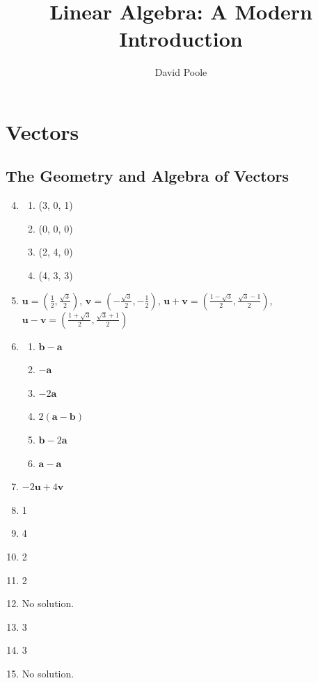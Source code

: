 \documentclass{article}
\title{Linear Algebra: A Modern Introduction}
\author{David Poole}
\date{}
\begin{document}
\maketitle
\section{Vectors}
\subsection{The Geometry and Algebra of Vectors}
\begin{enumerate}
  \setcounter{enumi}{3}
  \item \begin{enumerate}
          \item (3, 0, 1)
          \item (0, 0, 0)
          \item (2, 4, 0)
          \item (4, 3, 3)
        \end{enumerate}
        \setcounter{enumi}{12}
  \item $\mathbf{u}=(\frac{1}{2}, \frac{\sqrt{3}}{2})$,
        $\mathbf{v}=(-\frac{\sqrt{3}}{2}, -\frac{1}{2})$,
        $\mathbf{u}+\mathbf{v}=(\frac{1-\sqrt{3}}{2}, \frac{\sqrt{3}-1}{2})$,
        $\mathbf{u}-\mathbf{v}=(\frac{1+\sqrt{3}}{2}, \frac{\sqrt{3}+1}{2})$
  \item \begin{enumerate}
          \item $\mathbf{b}-\mathbf{a}$
          \item $-\mathbf{a}$
          \item $-2\mathbf{a}$
          \item $2(\mathbf{a}-\mathbf{b})$
          \item $\mathbf{b}-2\mathbf{a}$
          \item $\mathbf{a}-\mathbf{a}$
        \end{enumerate}
        \setcounter{enumi}{20}
  \item $-2\mathbf{u}+4\mathbf{v}$
        \setcounter{enumi}{39}
  \item 1
        \setcounter{enumi}{43}
  \item 4
  \item 2
  \item 2
  \item No solution.
  \item 3
  \item 3
  \item No solution.

\end{enumerate}
\end{document}

